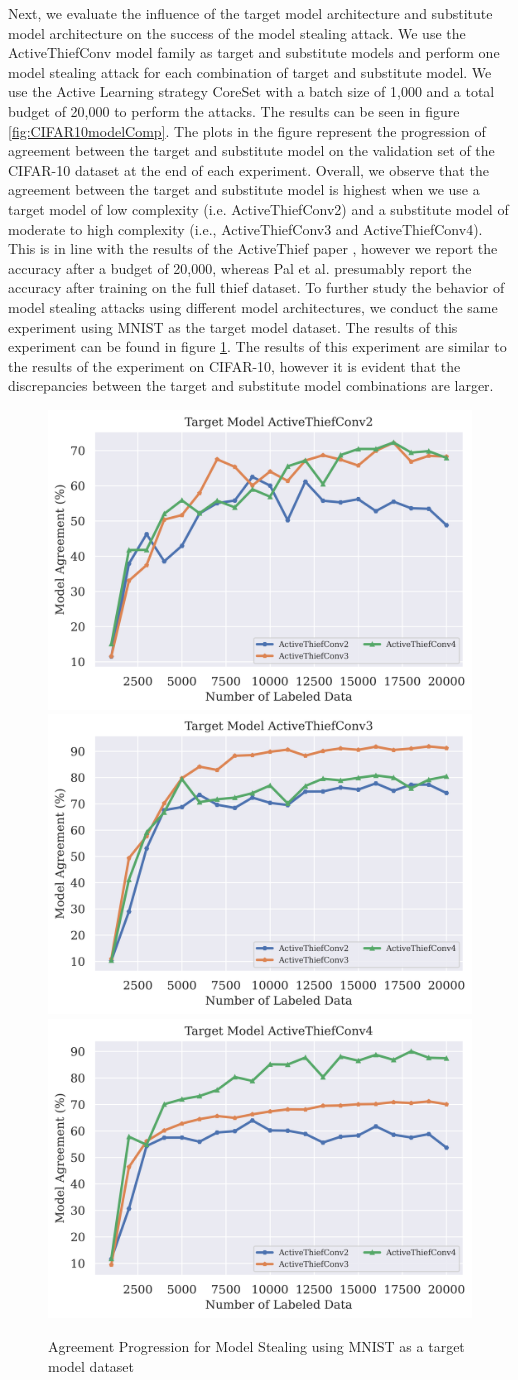 Next, we evaluate the influence of the target model architecture and substitute model architecture on the success of the model stealing attack. We use the ActiveThiefConv model
family as target and substitute models and perform one model stealing attack for each combination of target and substitute model. We use the Active Learning strategy CoreSet
with a batch size of 1,000 and a total budget of 20,000 to perform the attacks. The results can be seen in figure \ref{fig:CIFAR10modelComp}. The plots in the figure represent
the progression of agreement between the target and substitute model on the validation set of the CIFAR-10 dataset at the end of each experiment. Overall, we observe that the
agreement between the target and substitute model is highest when we use a target model of low complexity (i.e. ActiveThiefConv2) and a substitute model of moderate to high
complexity (i.e., ActiveThiefConv3 and ActiveThiefConv4). This is in line with the results of the ActiveThief paper \cite{pal2020activethief}, however we report the accuracy
after a budget of 20,000, whereas Pal et al. presumably report the accuracy after training on the full thief dataset. To further study the behavior of model stealing attacks using
different model architectures, we conduct the same experiment using MNIST as the target model dataset. The results of this experiment can be found in figure 
\ref{fig:MNISTmodelComp}. The results of this experiment are similar to the results of the experiment on CIFAR-10, however it is evident that the discrepancies between
the target and substitute model combinations are larger. \par

\begin{figure}[!htb]
    \centering
    \includegraphics[width=0.32\linewidth]{images/MSInsights/mnist_act2.png} \hfill
    \includegraphics[width=0.32\linewidth]{images/MSInsights/mnist_act3.png} \hfill
    \includegraphics[width=0.32\linewidth]{images/MSInsights/mnist_act4.png}
    \caption{Agreement Progression for Model Stealing using MNIST as a target model dataset}
    \label{fig:MNISTmodelComp}
\end{figure}

